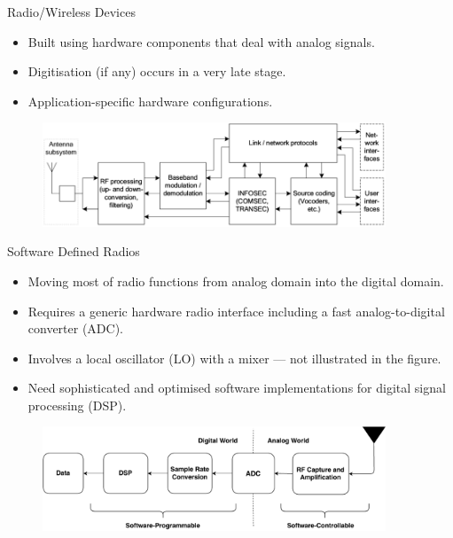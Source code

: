 \documentclass[handout]{beamer}
\begin{document}
\begin{frame}{Radio/Wireless Devices}  

\begin{itemize}
	\footnotesize
	\item Built using hardware components that deal with analog signals.
	\vspace{10pt}
	\item Digitisation (if any) occurs in a very late stage.
	\vspace{10pt}
	\item Application-specific hardware configurations.
\end{itemize}

	\begin{figure}
		\includegraphics[width=290pt]{figures/Radio-architecture-functional-overview.png}
	\end{figure}

\end{frame}


\begin{frame}{Software Defined Radios}  

\begin{itemize}
	\footnotesize
	\item Moving most of radio functions from analog domain into the digital domain.
	\vspace{10pt}
	\item Requires a generic hardware radio interface including a fast analog-to-digital converter (ADC).
	\vspace{10pt}
	\item Involves a local oscillator (LO) with a mixer --- not illustrated in the figure.
	\vspace{10pt}
	\item Need sophisticated and optimised software implementations for digital signal processing (DSP).
\end{itemize}

	\begin{figure}
		\includegraphics[width=290pt]{figures/sdr-architecture.pdf}
	\end{figure}

\end{frame}
\end{document}
